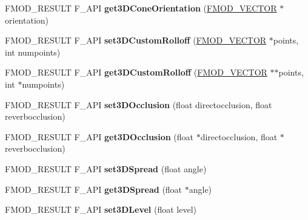 \begin{DoxyCompactItemize}
\item 
\mbox{\label{classFMOD_1_1ChannelControl_ac38d4525218249954c2efc5d55cec048}} 
F\+M\+O\+D\+\_\+\+R\+E\+S\+U\+LT F\+\_\+\+A\+PI {\bfseries get3\+D\+Cone\+Orientation} (\hyperlink{structFMOD__VECTOR}{F\+M\+O\+D\+\_\+\+V\+E\+C\+T\+OR} $\ast$orientation)
\item 
\mbox{\label{classFMOD_1_1ChannelControl_abf2c27cef2ec7500559855aa270b8669}} 
F\+M\+O\+D\+\_\+\+R\+E\+S\+U\+LT F\+\_\+\+A\+PI {\bfseries set3\+D\+Custom\+Rolloff} (\hyperlink{structFMOD__VECTOR}{F\+M\+O\+D\+\_\+\+V\+E\+C\+T\+OR} $\ast$points, int numpoints)
\item 
\mbox{\label{classFMOD_1_1ChannelControl_af4cafc98f162dab49c4eb17ac547ec3e}} 
F\+M\+O\+D\+\_\+\+R\+E\+S\+U\+LT F\+\_\+\+A\+PI {\bfseries get3\+D\+Custom\+Rolloff} (\hyperlink{structFMOD__VECTOR}{F\+M\+O\+D\+\_\+\+V\+E\+C\+T\+OR} $\ast$$\ast$points, int $\ast$numpoints)
\item 
\mbox{\label{classFMOD_1_1ChannelControl_aec9d420c82b59c552ab46f53b99a92a4}} 
F\+M\+O\+D\+\_\+\+R\+E\+S\+U\+LT F\+\_\+\+A\+PI {\bfseries set3\+D\+Occlusion} (float directocclusion, float reverbocclusion)
\item 
\mbox{\label{classFMOD_1_1ChannelControl_ad4bfb501ccd002ccbb0d0925d4258ef8}} 
F\+M\+O\+D\+\_\+\+R\+E\+S\+U\+LT F\+\_\+\+A\+PI {\bfseries get3\+D\+Occlusion} (float $\ast$directocclusion, float $\ast$reverbocclusion)
\item 
\mbox{\label{classFMOD_1_1ChannelControl_a12bba143567655a19886bdda772c60c6}} 
F\+M\+O\+D\+\_\+\+R\+E\+S\+U\+LT F\+\_\+\+A\+PI {\bfseries set3\+D\+Spread} (float angle)
\item 
\mbox{\label{classFMOD_1_1ChannelControl_a3b771f6762f3d472eda8d5e9e323f9c3}} 
F\+M\+O\+D\+\_\+\+R\+E\+S\+U\+LT F\+\_\+\+A\+PI {\bfseries get3\+D\+Spread} (float $\ast$angle)
\item 
\mbox{\label{classFMOD_1_1ChannelControl_a4ea9d36f487d6b0b41f1f9d64977c153}} 
F\+M\+O\+D\+\_\+\+R\+E\+S\+U\+LT F\+\_\+\+A\+PI {\bfseries set3\+D\+Level} (float level)
$$
\end{DoxyCompactItemize}
